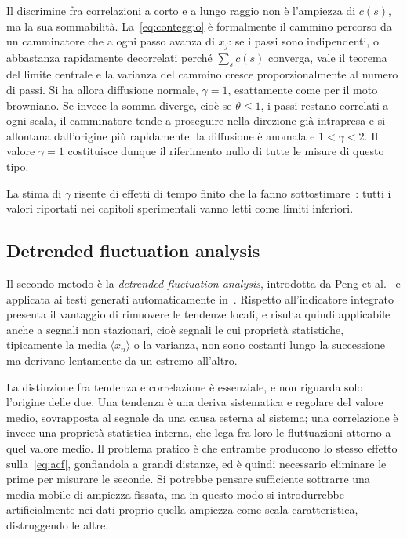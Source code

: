 Il discrimine fra correlazioni a corto e a lungo raggio non è l'ampiezza di
$c(s)$, ma la sua sommabilità. La~\eqref{eq:conteggio} è formalmente il
cammino percorso da un camminatore che a ogni passo avanza di $x_j$: se i passi
sono indipendenti, o abbastanza rapidamente decorrelati perché $\sum_s c(s)$
converga, vale il teorema del limite centrale e la varianza del cammino cresce
proporzionalmente al numero di passi. Si ha allora diffusione normale,
$\gamma = 1$, esattamente come per il moto browniano. Se invece la somma
diverge, cioè se $\theta \le 1$, i passi restano correlati a ogni scala, il
camminatore tende a proseguire nella direzione già intrapresa e si allontana
dall'origine più rapidamente: la diffusione è anomala e $1 < \gamma < 2$. Il
valore $\gamma = 1$ costituisce dunque il riferimento nullo di tutte le misure
di questo tipo.

La stima di $\gamma$ risente di effetti di tempo finito che la fanno
sottostimare~\cite{altmann2012}: tutti i valori riportati nei capitoli
sperimentali vanno letti come limiti inferiori.

\subsection{Detrended fluctuation analysis}
\label{sec:dfa}

Il secondo metodo è la \emph{detrended fluctuation analysis}, introdotta da
Peng et al.~\cite{peng1994} e applicata ai testi generati automaticamente
in~\cite{lippi2019}. Rispetto all'indicatore integrato presenta il vantaggio
di rimuovere le tendenze locali, e risulta quindi applicabile anche a segnali
non stazionari, cioè segnali le cui proprietà statistiche, tipicamente la
media $\langle x_n \rangle$ o la varianza, non sono costanti lungo la
successione ma derivano lentamente da un estremo all'altro.

La distinzione fra tendenza e correlazione è essenziale, e non riguarda solo
l'origine delle due. Una tendenza è una deriva sistematica e regolare del valore
medio, sovrapposta al segnale da una causa esterna al sistema; una correlazione
è invece una proprietà statistica interna, che lega fra loro le fluttuazioni
attorno a quel valore medio. Il problema pratico è che entrambe producono lo
stesso effetto sulla~\eqref{eq:acf}, gonfiandola a grandi distanze, ed è quindi
necessario eliminare le prime per misurare le seconde. Si potrebbe pensare
sufficiente sottrarre una media mobile di ampiezza fissata, ma in questo modo si
introdurrebbe artificialmente nei dati proprio quella ampiezza come scala
caratteristica, distruggendo le altre.


